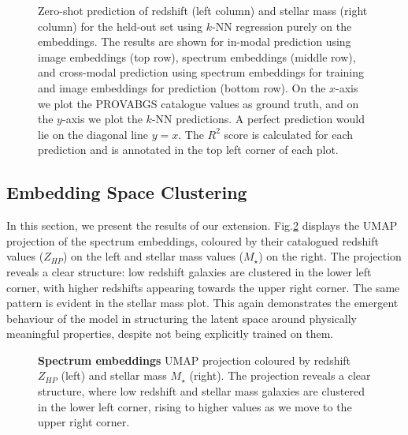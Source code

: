 \documentclass[a4paper,12pt]{article}
\begin{document}
\begin{figure}[H]
    \caption{Zero-shot prediction of redshift (left column) and stellar mass (right column) for the held-out set using $k$-NN regression purely on the embeddings. The results are shown for in-modal prediction using image embeddings (top row), spectrum embeddings (middle row), and cross-modal prediction using spectrum embeddings for training and image embeddings for prediction (bottom row). On the $x$-axis we plot the PROVABGS catalogue values as ground truth, and on the $y$-axis we plot the $k$-NN predictions. A perfect prediction would lie on the diagonal line $ y = x $. The $R^2$ score is calculated for each prediction and is annotated in the top left corner of each plot.}
    \label{fig:zeroshot}
\end{figure}



\subsection{Embedding Space Clustering}
In this section, we present the results of our extension. Fig.\ref{fig:umap_of_spectra} displays the UMAP projection of the spectrum embeddings, coloured by their catalogued redshift values ($Z_{HP}$) on the left and stellar mass values ($M_{\star}$) on the right. The projection reveals a clear structure: low redshift galaxies are clustered in the lower left corner, with higher redshifts appearing towards the upper right corner. The same pattern is evident in the stellar mass plot. This again demonstrates the emergent behaviour of the model in structuring the latent space around physically meaningful properties, despite not being explicitly trained on them.


\begin{figure}[H]
    \centering
    \caption{\textbf{Spectrum embeddings} UMAP projection coloured by redshift $Z_{HP}$ (left) and stellar mass $M_{\star}$ (right). The projection reveals a clear structure, where low redshift and stellar mass galaxies are clustered in the lower left corner, rising to higher values as we move to the upper right corner.}
    \label{fig:umap_of_spectra}
\end{figure}
\end{document}
